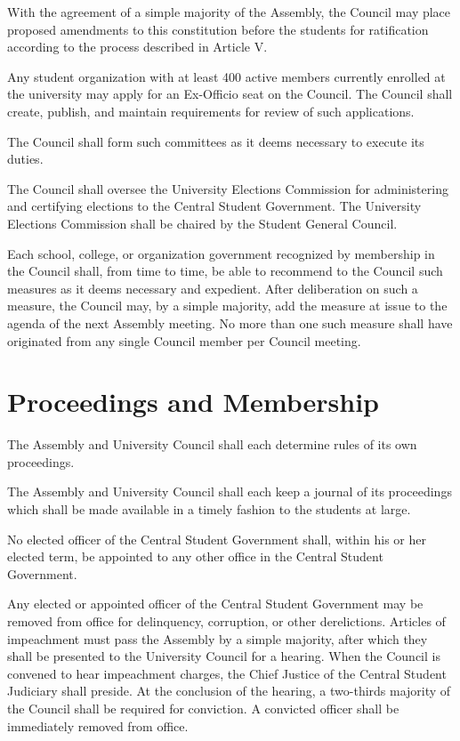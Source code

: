     With the agreement of a simple majority of the Assembly, the Council may place proposed amendments to this constitution before the students for ratification according to the process described in Article V.

    Any student organization with at least 400 active members currently enrolled at the university may apply for an Ex-Officio seat on the Council. The Council shall create, publish, and maintain requirements for review of such applications.

    The Council shall form such committees as it deems necessary to execute its duties.

    The Council shall oversee the University Elections Commission for administering and certifying elections to the Central Student Government. The University Elections Commission shall be chaired by the Student General Council.

    Each school, college, or organization government recognized by membership in the Council shall, from time to time, be able to recommend to the Council such measures as it deems necessary and expedient. After deliberation on such a measure, the Council may, by a simple majority, add the measure at issue to the agenda of the next Assembly meeting. No more than one such measure shall have originated from any single Council member per Council meeting.

\section{Proceedings and Membership}
    The Assembly and University Council shall each determine rules of its own proceedings.

    The Assembly and University Council shall each keep a journal of its proceedings which shall be made available in a timely fashion to the students at large.

    No elected officer of the Central Student Government shall, within his or her elected term, be appointed to any other office in the Central Student Government.

    Any elected or appointed officer of the Central Student Government may be removed from office for delinquency, corruption, or other derelictions. Articles of impeachment must pass the Assembly by a simple majority, after which they shall be presented to the University Council for a hearing. When the Council is convened to hear impeachment charges, the Chief Justice of the Central Student Judiciary shall preside. At the conclusion of the hearing, a two-thirds majority of the Council shall be required for conviction. A convicted officer shall be immediately removed from office.

